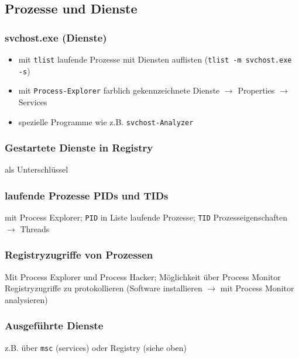 \subsection{Prozesse und Dienste}
\subsubsection{svchost.exe (Dienste)}
\begin{itemize}[leftmargin=*]
	\item mit \texttt{tlist} laufende Prozesse mit Diensten auflisten (\texttt{tlist -m svchost.exe -s})
	\item mit \texttt{Process-Explorer} farblich gekennzeichnete Dienste $\rightarrow$ Properties $\rightarrow$ Services
	\item spezielle Programme wie z.B. \texttt{svchost-Analyzer}
\end{itemize}

\subsubsection{Gestartete Dienste in Registry}
 als Unterschlüssel

\subsubsection{laufende Prozesse PIDs und TIDs}
mit Process Explorer; \texttt{PID} in Liste laufende Prozesse; \texttt{TID} Prozesseigenschaften $\rightarrow$ Threads\\

\subsubsection{Registryzugriffe von Prozessen}
Mit Process Explorer und Process Hacker; Möglichkeit über Process Monitor Registryzugriffe zu protokollieren (Software installieren $\rightarrow$ mit Process Monitor analysieren)\\

\subsubsection{Ausgeführte Dienste}
z.B. über \texttt{msc} (services) oder Registry (siehe oben)

